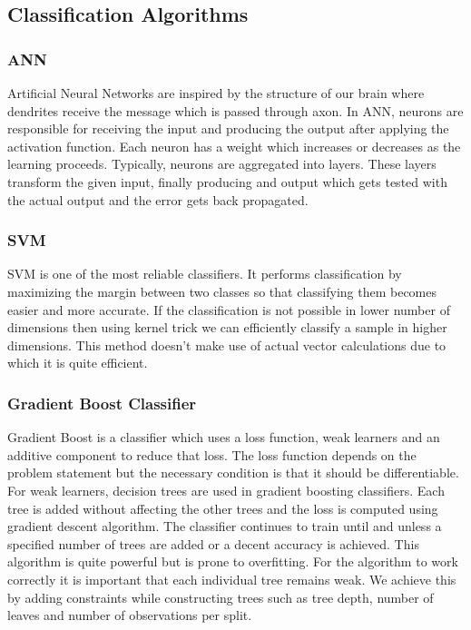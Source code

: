 \subsection{Classification Algorithms}
\label{subsection:classificationAlgos}

\subsubsection{ANN}
\label{subsubsection:ann}
Artificial Neural Networks are inspired by the structure of our brain where dendrites receive the message which is passed through axon\cite{book:ann}. In ANN, neurons are responsible for receiving the input and producing the output after applying the activation function. Each neuron has a weight which increases or decreases as the learning proceeds. Typically, neurons are aggregated into layers. These layers transform the given input, finally producing and output which gets tested with the actual output and the error gets back propagated. 

\subsubsection{SVM}
\label{subsubsection:svm}
SVM is one of the most reliable classifiers. It performs classification by maximizing the margin between two classes so that classifying them becomes easier and more accurate\cite{article:svm}. If the classification is not possible in lower number of dimensions then using kernel trick we can efficiently classify a sample in higher dimensions. This method doesn't make use of actual vector calculations due to which it is quite efficient.

\subsubsection{Gradient Boost Classifier}
\label{subsubsection:gradientBoost}
Gradient Boost is a classifier which uses a loss function, weak learners and an additive component to reduce that loss\cite{article:gradientBoosting}. The loss function depends on the problem statement but the necessary condition is that it should be differentiable. For weak learners, decision trees are used in gradient boosting classifiers. Each tree is added without affecting the other trees and the loss is computed using gradient descent algorithm. The classifier continues to train until and unless a specified number of trees are added or a decent accuracy is achieved. This algorithm is quite powerful but is prone to overfitting. For the algorithm to work correctly it is important that each individual tree remains weak. We achieve this by adding constraints while constructing trees such as tree depth, number of leaves and number of observations per split.

